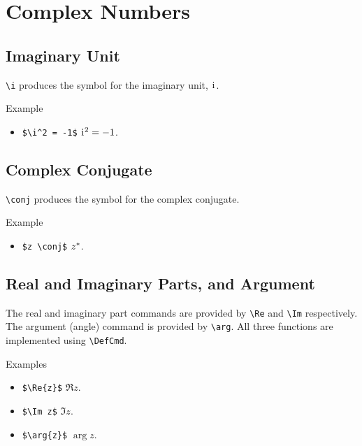 \section{Complex Numbers}

\subsection{Imaginary Unit}

\verb|\i| produces the symbol for the imaginary unit, $\mkern1mu\mathrm{i}\mkern1mu$.

\begin{myframe}{Example }
    \begin{itemize}
        \item \verb|$\i^2 = -1$| \produces{} $\mkern1mu\mathrm{i}\mkern1mu^2 = -1$.
    \end{itemize}
\end{myframe}

\subsection{Complex Conjugate}

\verb|\conj| produces the symbol for the complex conjugate.

\begin{myframe}{Example }
    \begin{itemize}
        \item \verb|$z \conj$| \produces{} $z ^\ast$.
    \end{itemize}
\end{myframe}

\subsection{Real and Imaginary Parts, and Argument}

The real and imaginary part commands are provided by \verb|\Re| and \verb|\Im| respectively. The argument (angle) command is provided by \verb|\arg|. All three functions are implemented using \verb|\DefCmd|.

\begin{myframe}{Examples}
    \begin{itemize}
        \item \verb|$\Re{z}$| \produces{} $\Re{z}$.
        \item \verb|$\Im z$| \produces{} $\Im z$.
        \item \verb|$\arg{z}$| \produces{} $\arg{z}$.
    \end{itemize}
\end{myframe}